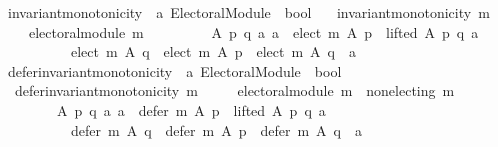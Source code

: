 \begin{isabellebody}
\isanewline
\isanewline
{}\isamarkupfalse%
\ invariant{\isacharunderscore}{\kern0pt}monotonicity\ {\isacharcolon}{\kern0pt}{\isacharcolon}{\kern0pt}\ {\isachardoublequoteopen}{\isacharprime}{\kern0pt}a\ Electoral{\isacharunderscore}{\kern0pt}Module\ {\isasymRightarrow}\ bool{\isachardoublequoteclose}\ \isanewline
\ \ {\isachardoublequoteopen}invariant{\isacharunderscore}{\kern0pt}monotonicity\ m\ {\isasymequiv}\isanewline
\ \ \ \ electoral{\isacharunderscore}{\kern0pt}module\ m\ {\isasymand}\isanewline
\ \ \ \ \ \ \ \ {\isacharparenleft}{\kern0pt}{\isasymforall}A\ p\ q\ a{\isachardot}{\kern0pt}\ {\isacharparenleft}{\kern0pt}a\ {\isasymin}\ elect\ m\ A\ p\ {\isasymand}\ lifted\ A\ p\ q\ a{\isacharparenright}{\kern0pt}\ {\isasymlongrightarrow}\isanewline
\ \ \ \ \ \ \ \ \ \ {\isacharparenleft}{\kern0pt}elect\ m\ A\ q\ {\isacharequal}{\kern0pt}\ elect\ m\ A\ p\ {\isasymor}\ elect\ m\ A\ q\ {\isacharequal}{\kern0pt}\ {\isacharbraceleft}{\kern0pt}a{\isacharbraceright}{\kern0pt}{\isacharparenright}{\kern0pt}{\isacharparenright}{\kern0pt}{\isachardoublequoteclose}\isanewline
\isanewline
\isanewline
{}\isamarkupfalse%
\ defer{\isacharunderscore}{\kern0pt}invariant{\isacharunderscore}{\kern0pt}monotonicity\ {\isacharcolon}{\kern0pt}{\isacharcolon}{\kern0pt}\ {\isachardoublequoteopen}{\isacharprime}{\kern0pt}a\ Electoral{\isacharunderscore}{\kern0pt}Module\ {\isasymRightarrow}\ bool{\isachardoublequoteclose}\ \isanewline
\ \ {\isachardoublequoteopen}defer{\isacharunderscore}{\kern0pt}invariant{\isacharunderscore}{\kern0pt}monotonicity\ m\ {\isasymequiv}\isanewline
\ \ \ \ electoral{\isacharunderscore}{\kern0pt}module\ m\ {\isasymand}\ non{\isacharunderscore}{\kern0pt}electing\ m\ {\isasymand}\isanewline
\ \ \ \ \ \ \ \ {\isacharparenleft}{\kern0pt}{\isasymforall}A\ p\ q\ a{\isachardot}{\kern0pt}\ {\isacharparenleft}{\kern0pt}a\ {\isasymin}\ defer\ m\ A\ p\ {\isasymand}\ lifted\ A\ p\ q\ a{\isacharparenright}{\kern0pt}\ {\isasymlongrightarrow}\isanewline
\ \ \ \ \ \ \ \ \ \ {\isacharparenleft}{\kern0pt}defer\ m\ A\ q\ {\isacharequal}{\kern0pt}\ defer\ m\ A\ p\ {\isasymor}\ defer\ m\ A\ q\ {\isacharequal}{\kern0pt}\ {\isacharbraceleft}{\kern0pt}a{\isacharbraceright}{\kern0pt}{\isacharparenright}{\kern0pt}{\isacharparenright}{\kern0pt}{\isachardoublequoteclose}%
\isadelimdocument
%
\endisadelimdocument
%
\isatagdocument
%
\isamarkuptrue%
%
\endisatagdocument
{\isafolddocument}%
%
\isadelimdocument
%
\endisadelimdocument
{}\isamarkupfalse%

\end{isabellebody}
